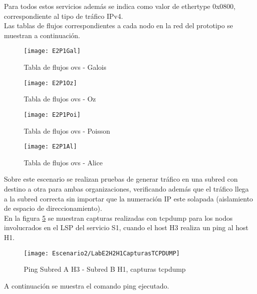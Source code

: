Para todos estos servicios adem\'as se indica como valor de ethertype 0x0800, correspondiente al tipo de tr\'afico IPv4.\\

Las tablas de flujos correspondientes a cada nodo en la red del prototipo se muestran a continuaci\'on.

\newpage
\begin{figure}[ht!] 
\centering    
\texttt{[image: E2P1Gal]}
\caption[Tabla de flujos ovs - Galois]{Tabla de flujos ovs - Galois}
\label{fig:CU1P1DumpFlows1}
\end{figure}

\begin{figure}[h!] 
\centering    
\texttt{[image: E2P1Oz]}
\caption[Tabla de flujos ovs - Oz]{Tabla de flujos ovs - Oz}
\label{fig:CU1P1DumpFlows2}
\end{figure}

\begin{figure}[h!] 
\centering    
\texttt{[image: E2P1Poi]}
\caption[Tabla de flujos ovs - Poisson]{Tabla de flujos ovs - Poisson}
\label{fig:CU1P1DumpFlows3}
\end{figure}

\newpage
\begin{figure}[ht!] 
\centering    
\texttt{[image: E2P1Al]}
\caption[Tabla de flujos ovs - Alice]{Tabla de flujos ovs - Alice}
\label{fig:CU1P1DumpFlows4}
\end{figure}

Sobre este escenario se realizan pruebas de generar tr\'afico en una subred con destino a otra para ambas organizaciones, verificando adem\'as que el tr\'afico llega a la subred correcta sin importar que la numeraci\'on IP este solapada (aislamiento de espacio de direccionamiento).\\

En la figura \ref{fig:CU1P1DumpFlows5} se muestran capturas realizadas con tcpdump para los nodos involucrados en el LSP del servicio S1, cuando el host H3 realiza un ping al host H1.\\
\begin{figure}[h!] 
\centering    
\texttt{[image: Escenario2/LabE2H2H1CapturasTCPDUMP]}
\caption[Ping Subred A H3 - Subred B H1, capturas tcpdump]{Ping Subred A H3 - Subred B H1, capturas tcpdump}
\label{fig:CU1P1DumpFlows5}
\end{figure}

A continuaci\'on se muestra el comando ping ejecutado.

